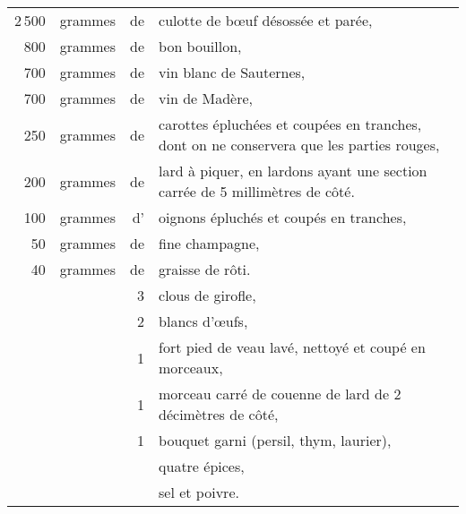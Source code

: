 \medskip

\footnotesize
\begin{longtable}{rrrp{16em}}
  2 500 & grammes & de & culotte de bœuf désossée et parée,                                               \\
    800 & grammes & de & bon bouillon,                                                                    \\
    700 & grammes & de & vin blanc de Sauternes,                                                          \\
    700 & grammes & de & vin de Madère,                                                                   \\
    250 & grammes & de & carottes épluchées et coupées en tranches,
                         dont on ne conservera que les parties rouges,                                    \\
    200 & grammes & de & lard à piquer, en lardons ayant une section carrée de 5 millimètres de côté.     \\
    100 & grammes & d' & oignons épluchés et coupés en tranches,                                          \\
     50 & grammes & de & fine champagne,                                                                  \\
     40 & grammes & de & graisse de rôti.                                                                 \\
        &         &  3 & clous de girofle,                                                                \\
        &         &  2 & blancs d'œufs,                                                                   \\
        &         &  1 & fort pied de veau lavé, nettoyé et coupé en morceaux,                            \\
        &         &  1 & morceau carré de couenne de lard de 2 décimètres de côté,                        \\
        &         &  1 & bouquet garni (persil, thym, laurier),                                           \\
        &         &    & quatre épices,                                                                   \\
        &         &    & sel et poivre.                                                                   \\
\end{longtable}
\normalsize

